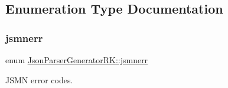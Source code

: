 \subsection{Enumeration Type Documentation}
\mbox{\label{namespace_json_parser_generator_r_k_ab03a941ba316b9487a16636e6db43edf}} 
\subsubsection{\texorpdfstring{jsmnerr}{jsmnerr}}
{\footnotesize\ttfamily enum \hyperlink{namespace_json_parser_generator_r_k_ab03a941ba316b9487a16636e6db43edf}{Json\+Parser\+Generator\+R\+K\+::jsmnerr}}



J\+S\+MN error codes. 

